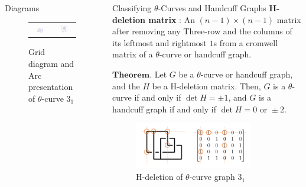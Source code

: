 \documentclass[final]{beamer}
\begin{document}
\begin{frame}[t]
\begin{columns}[t]
\begin{block}{Diagrams}
    \begin{figure}[h]
      \centering
      \begin{tabular}{cc}
        \includegraphics[width=0.4\textwidth]{figure/grid.png} &
        \includegraphics[width=0.4\textwidth]{figure/openbook.png} \\
      \end{tabular}        
      \caption{Grid diagram and Arc presentation of $\theta$-curve $3_1$}
    \end{figure}
  \end{block}
    


  \begin{block}{Classifying $\theta$-Curves and Handcuff Graphs}
  \textbf{H-deletion matrix} : An $(n{-}1)\times(n{-}1)$ matrix after removing any Three-row and the columns of its leftmost and rightmost $1$s from a cromwell matrix of a $\theta$-curve or handcuff graph. 

  \vspace{0.33em}
  
  $\mathbf{Theorem.}$ Let $G$ be a $\theta$-curve or handcuff graph, and the $H$ be a H-deletion matrix. Then,
  $G$ is a $\theta$-curve if and only if $\det{H} = \pm 1$, and $G$ is a handcuff graph if and only if $\det{H} = 0 \text{ or } \pm2$.
  \begin{figure}[h]
    \centering
    \includegraphics[width=0.8\textwidth]{figure/Hdeletion.png}
    \caption{H-deletion of $\theta$-curve graph $3_1$}
  \end{figure}
  \end{block}


\end{columns}
\end{frame}
\end{document}
